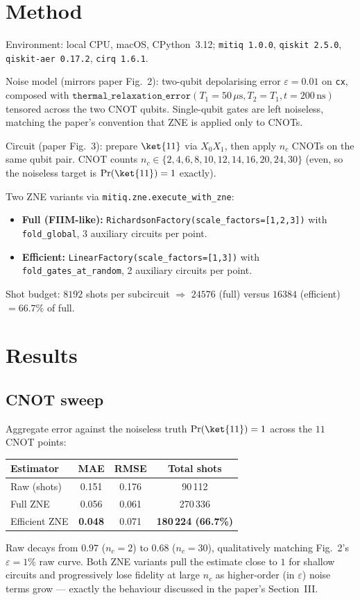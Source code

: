 \documentclass[11pt]{article}
\begin{document}
\section{Method}
Environment: local CPU, macOS, CPython~3.12; \texttt{mitiq 1.0.0},
\texttt{qiskit 2.5.0}, \texttt{qiskit-aer 0.17.2}, \texttt{cirq 1.6.1}.

Noise model (mirrors paper Fig.~2): two-qubit depolarising error
$\varepsilon = 0.01$ on \texttt{cx}, composed with
$\texttt{thermal\_relaxation\_error}(T_1{=}50\,\mu\mathrm{s},
T_2{=}T_1, t{=}200\,\mathrm{ns})$ tensored across the two CNOT qubits.
Single-qubit gates are left noiseless, matching the paper's convention that ZNE
is applied only to CNOTs.

Circuit (paper Fig.~3): prepare $\ket{11}$ via $X_0 X_1$, then apply $n_c$ CNOTs
on the same qubit pair. CNOT counts $n_c \in \{2,4,6,8,10,12,14,16,20,24,30\}$
(even, so the noiseless target is $\Pr(\ket{11}) = 1$ exactly).

Two ZNE variants via \texttt{mitiq.zne.execute\_with\_zne}:
\begin{itemize}
\item \textbf{Full (FIIM-like):} \texttt{RichardsonFactory(scale\_factors=[1,2,3])}
with \texttt{fold\_global}, 3 auxiliary circuits per point.
\item \textbf{Efficient:} \texttt{LinearFactory(scale\_factors=[1,3])} with
\texttt{fold\_gates\_at\_random}, 2 auxiliary circuits per point.
\end{itemize}
Shot budget: $8192$ shots per subcircuit $\Rightarrow$ $24576$ (full) versus
$16384$ (efficient) $=66.7\%$ of full.

\section{Results}
\subsection{CNOT sweep}
Aggregate error against the noiseless truth $\Pr(\ket{11})=1$ across the
$11$ CNOT points:
\begin{center}
\begin{tabular}{lccc}
\toprule
Estimator & MAE & RMSE & Total shots \\
\midrule
Raw (shots)   & 0.151 & 0.176 & 90\,112 \\
Full ZNE      & 0.056 & 0.061 & 270\,336 \\
Efficient ZNE & \textbf{0.048} & 0.071 & \textbf{180\,224 (66.7\%)} \\
\bottomrule
\end{tabular}
\end{center}
Raw decays from $0.97$ ($n_c{=}2$) to $0.68$ ($n_c{=}30$), qualitatively
matching Fig.~2's $\varepsilon{=}1\%$ raw curve. Both ZNE variants pull the
estimate close to $1$ for shallow circuits and progressively lose fidelity at
large $n_c$ as higher-order (in $\varepsilon$) noise terms grow --- exactly the
behaviour discussed in the paper's Section~III.
\end{document}
